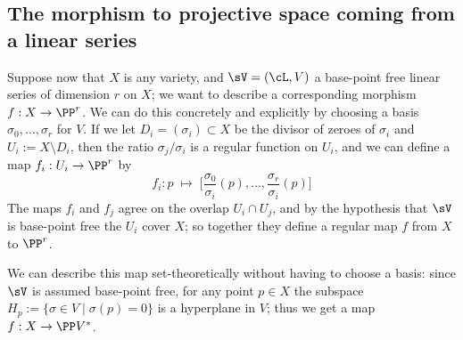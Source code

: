 \subsection{The morphism to projective space coming from a linear series} \label{morphism from series}

Suppose now that $X$ is any variety, and $\sV = (\cL, V)$ a base-point free linear series of dimension $r$ on $X$; we want to describe a corresponding morphism $f : X \to \PP^r$. We can do this concretely and explicitly by choosing a basis $\sigma_0, \dots, \sigma_r$ for $V$. If we let $D_i = (\sigma_i) \subset X$ be the divisor of zeroes of $\sigma_i$ and $U_i := X \setminus D_i$, then the ratio $\sigma_j/\sigma_i$ is a regular function on $U_i$, and
we can define a map $f_i : U_i \to \PP^r$ by
$$
f_i : p \; \mapsto \; \big[\frac{\sigma_0}{\sigma_i}(p), \dots, \frac{\sigma_r}{\sigma_i}(p)\big]
$$
The maps $f_i$ and $f_j$ agree on the overlap $U_i \cap U_j$, and by the hypothesis that $\sV$ is base-point free the $U_i$ cover $X$;
so together they define a regular map $f$ from $X$ to $\PP^r$. 

We can describe this map set-theoretically without having to choose a basis: since $\sV$ is assumed base-point free, for any point $p \in X$ the subspace $H_p := \{ \sigma \in V \mid \sigma(p) = 0 \}$ is a hyperplane in $V$; thus we get a map $f : X \to \PP V^*$.


